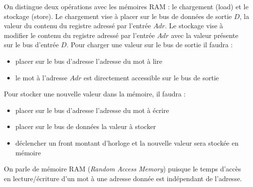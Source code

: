 On distingue deux opérations avec les mémoires RAM : le chargement (load) et le stockage (store). Le chargement vise à placer sur le bus de données de sortie $D$, la valeur du contenu du registre adressé par l'entrée $Adr$. Le stockage vise à modifier le contenu du registre adressé par l'entrée $Adr$ avec la valeur présente sur le bus d'entrée $D$. Pour charger une valeur sur le bus de sortie il faudra :
\begin{itemize}
\item placer sur le bus d'adresse l'adresse du mot à lire
\item le mot à l'adresse $Adr$ est directement accessible sur le bus de sortie
\end{itemize}

Pour stocker une nouvelle valeur dans la mémoire, il faudra :
\begin{itemize}
\item placer sur le bus d'adresse l'adresse du mot à écrire
\item placer sur le bus de données la valeur à stocker
\item déclencher un front montant d'horloge et la nouvelle valeur sera stockée en mémoire
\end{itemize}

On parle de mémoire RAM (\emph{Random Access Memory}) puisque le temps d'accès en lecture/écriture d'un mot à une adresse donnée est indépendant de l'adresse.


